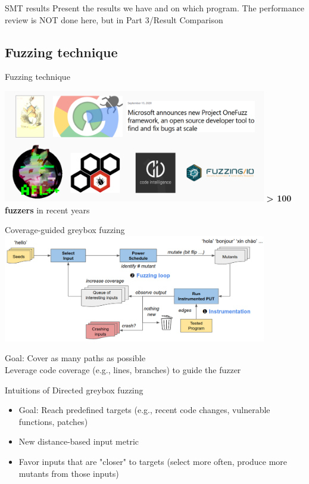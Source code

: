 \documentclass{beamer}
\begin{document}
\begin{frame}{SMT results}
Present the results we have and on which program. The performance review is NOT done here, but in Part 3/Result Comparison
\end{frame}

\subsection{Fuzzing technique}

\begin{frame}{Fuzzing technique}

\includegraphics[width=11.5cm]{Figures/Fuzzing/graph1.png}
\centering\textbf{> 100 fuzzers} in recent years
\end{frame}

\begin{frame}{Coverage-guided greybox fuzzing}
\includegraphics[width=11.5cm]{Figures/Fuzzing/graph2.png}

\centering Goal: Cover as many paths as possible\\
\centering Leverage code coverage (e.g., lines, branches) to guide the fuzzer
\end{frame}

\begin{frame}{Intuitions of Directed greybox fuzzing}
\begin{itemize}
	\item Goal: Reach predefined targets (e.g., recent code changes, vulnerable functions, patches)
	\item New distance-based input metric
	\item Favor inputs that are "closer" to targets (select more often, produce more mutants from those inputs)
\end{itemize}
\end{frame}
\end{document}
